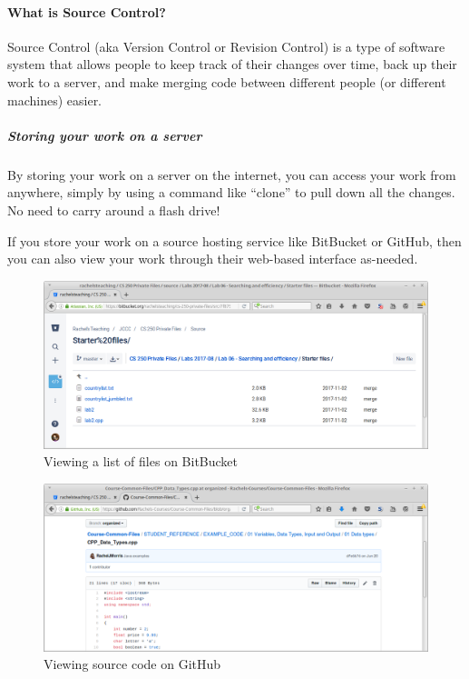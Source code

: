 \documentclass[a4paper,12pt,oneside]{book}
\begin{document}
    \paragraph{What is Source Control?}

        Source Control (aka Version Control or Revision Control) is a
        type of software system that allows people to keep track of their
        changes over time, back up their work to a server, and make
        merging code between different people (or different machines)
        easier.

        \subparagraph{Storing your work on a server}
            By storing your work on a server on the internet, you can access
            your work from anywhere, simply by using a command like ``clone''
            to pull down all the changes. No need to carry around a flash drive!

            If you store your work on a source hosting service like BitBucket
            or GitHub, then you can also view your work through their web-based
            interface as-needed.

            \begin{figure}[h]
                \centering
                \includegraphics[width=12cm]{images/bitbucket-view.png}
                \caption{Viewing a list of files on BitBucket}
            \end{figure}

            \begin{figure}[h]
                \centering
                \includegraphics[width=12cm]{images/github-view.png}
                \caption{Viewing source code on GitHub}
            \end{figure}
\end{document}

